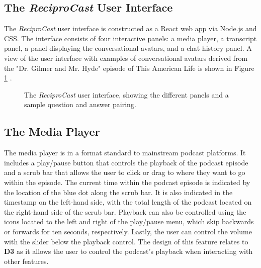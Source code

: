 \documentclass[12pt]{report}
\begin{document}
\begin{myfont}
        \section{The \textit{ReciproCast} User Interface}
        The \textit{ReciproCast} user interface is constructed as a React web app via Node.js and CSS. The interface consists of four interactive panels: a media player, a transcript panel, a panel displaying the conversational avatars, and a chat history panel. A view of the user interface with examples of conversational avatars derived from the "Dr. Gilmer and Mr. Hyde" episode of This American Life is shown in Figure \ref{fig:frontend} \citep{ThisAmericanLife2013}.

        \begin{figure}[H]
            \noindent
              \caption{The \textit{ReciproCast} user interface, showing the different panels and a sample question and answer pairing.}
              \label{fig:frontend}
        \end{figure}

        \subsection{The Media Player}
        \indent The media player is in a format standard to mainstream podcast platforms. It includes a play/pause button that controls the playback of the podcast episode and a scrub bar that allows the user to click or drag to where they want to go within the episode. The current time within the podcast episode is indicated by the location of the blue dot along the scrub bar. It is also indicated in the timestamp on the left-hand side, with the total length of the podcast located on the right-hand side of the scrub bar. Playback can also be controlled using the icons located to the left and right of the play/pause menu, which skip backwards or forwards for ten seconds, respectively. Lastly, the user can control the volume with the slider below the playback control. The design of this feature relates to \textbf{D3} as it allows the user to control the podcast's playback when interacting with other features. 
        

\end{myfont}
\end{document}
